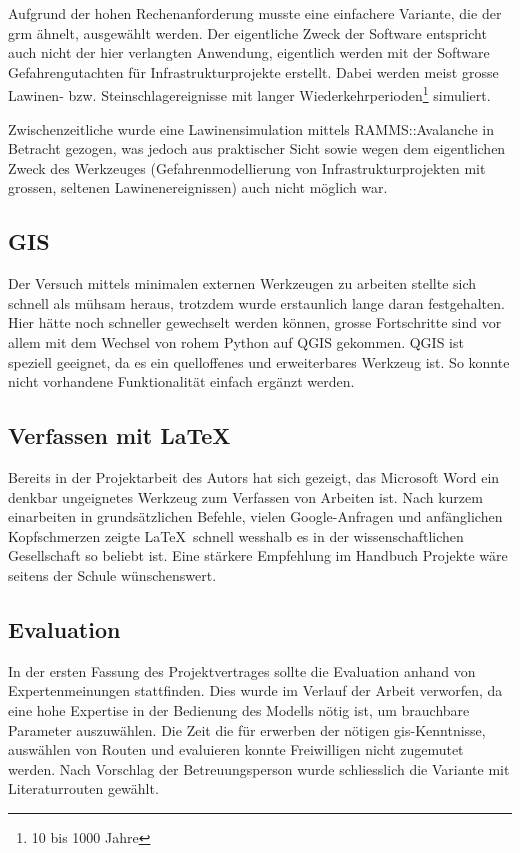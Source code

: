 Aufgrund der hohen Rechenanforderung musste eine einfachere Variante, die der \gls{grm} ähnelt, ausgewählt werden. Der eigentliche Zweck der Software entspricht auch nicht der hier verlangten Anwendung, eigentlich werden mit der Software Gefahrengutachten für Infrastrukturprojekte erstellt. Dabei werden meist grosse Lawinen- bzw. Steinschlagereignisse mit langer Wiederkehrperioden\footnote{10 bis 1000 Jahre} simuliert. 



Zwischenzeitliche wurde eine Lawinensimulation mittels RAMMS::Avalanche in Betracht gezogen, was jedoch aus praktischer Sicht sowie wegen dem eigentlichen Zweck des Werkzeuges (Gefahrenmodellierung von Infrastrukturprojekten mit grossen, seltenen Lawinenereignissen) auch nicht möglich war.

\subsection{GIS}

Der Versuch mittels minimalen externen Werkzeugen zu arbeiten stellte sich schnell als mühsam heraus, trotzdem wurde erstaunlich lange daran festgehalten. Hier hätte noch schneller gewechselt werden können, grosse Fortschritte sind vor allem mit dem Wechsel von rohem Python auf QGIS gekommen. QGIS ist speziell geeignet, da es ein quelloffenes und erweiterbares Werkzeug ist. So konnte nicht vorhandene Funktionalität einfach ergänzt werden.

\subsection{Verfassen mit \LaTeX}
Bereits in der Projektarbeit des Autors hat sich gezeigt, das Microsoft Word ein denkbar ungeignetes Werkzeug zum Verfassen von Arbeiten ist. Nach kurzem einarbeiten in grundsätzlichen Befehle, vielen Google-Anfragen und anfänglichen Kopfschmerzen zeigte \LaTeX\ schnell wesshalb es in der wissenschaftlichen Gesellschaft so beliebt ist. Eine stärkere Empfehlung im Handbuch Projekte wäre seitens der Schule wünschenswert.

\subsection{Evaluation}

In der ersten Fassung des Projektvertrages sollte die Evaluation anhand von Expertenmeinungen stattfinden. Dies wurde im  Verlauf der Arbeit verworfen, da eine hohe Expertise in der Bedienung des Modells nötig ist, um brauchbare Parameter auszuwählen. Die Zeit die für erwerben der nötigen \gls{gis}-Kenntnisse, auswählen von Routen und evaluieren konnte Freiwilligen nicht zugemutet werden. Nach Vorschlag der Betreuungsperson wurde schliesslich die Variante mit Literaturrouten gewählt.

